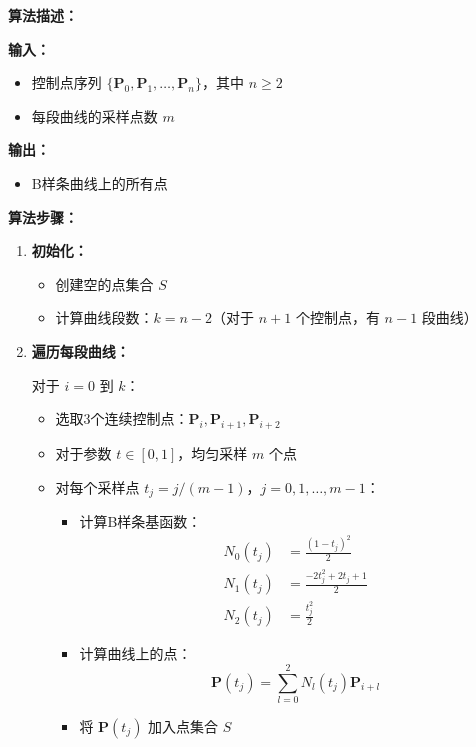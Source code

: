 \documentclass[12pt,a4paper]{article}
\begin{document}
\begin{tcolorbox}[breakable]
\textbf{算法描述：}

\textbf{输入：}
\begin{itemize}
\item 控制点序列 $\{\mathbf{P}_0, \mathbf{P}_1, \ldots, \mathbf{P}_n\}$，其中 $n \geq 2$
\item 每段曲线的采样点数 $m$
\end{itemize}

\textbf{输出：}
\begin{itemize}
\item B样条曲线上的所有点
\end{itemize}

\textbf{算法步骤：}

\begin{enumerate}
\item \textbf{初始化：}
  \begin{itemize}
  \item 创建空的点集合 $S$
  \item 计算曲线段数：$k = n - 2$（对于 $n+1$ 个控制点，有 $n-1$ 段曲线）
  \end{itemize}

\item \textbf{遍历每段曲线：}

  对于 $i = 0$ 到 $k$：
  \begin{itemize}
  \item 选取3个连续控制点：$\mathbf{P}_i, \mathbf{P}_{i+1}, \mathbf{P}_{i+2}$
  \item 对于参数 $t \in [0, 1]$，均匀采样 $m$ 个点
  \item 对每个采样点 $t_j = j/(m-1)$，$j = 0, 1, \ldots, m-1$：
    \begin{itemize}
    \item 计算B样条基函数：
      \begin{align*}
      N_0(t_j) &= \frac{(1-t_j)^2}{2} \\
      N_1(t_j) &= \frac{-2t_j^2 + 2t_j + 1}{2} \\
      N_2(t_j) &= \frac{t_j^2}{2}
      \end{align*}
    \item 计算曲线上的点：
      \begin{equation}
      \mathbf{P}(t_j) = \sum_{l=0}^{2} N_l(t_j) \mathbf{P}_{i+l}
      \end{equation}
    \item 将 $\mathbf{P}(t_j)$ 加入点集合 $S$
    \end{itemize}
  \end{itemize}


\end{enumerate}
\end{tcolorbox}
\end{document}
